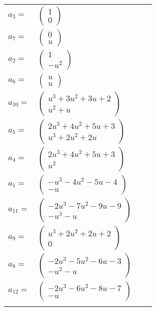 \documentclass[1p]{elsarticle_modified}
\theoremstyle{definition}
\begin{document}
\begin{tabular}{m{7pt} m{180pt} m{7pt} m{180pt} }
\flushright $a_{3}=$&$\begin{pmatrix}1\\0\end{pmatrix}$ \\
\flushright $a_{7}=$&$\begin{pmatrix}0\\u\end{pmatrix}$ \\
\flushright $a_{2}=$&$\begin{pmatrix}1\\- u^2\end{pmatrix}$ \\
\flushright $a_{6}=$&$\begin{pmatrix}u\\u\end{pmatrix}$ \\
\flushright $a_{10}=$&$\begin{pmatrix}u^3+3 u^2+3 u+2\\u^2+u\end{pmatrix}$ \\
\flushright $a_{5}=$&$\begin{pmatrix}2 u^3+4 u^2+5 u+3\\u^3+2 u^2+2 u\end{pmatrix}$ \\
\flushright $a_{4}=$&$\begin{pmatrix}2 u^3+4 u^2+5 u+3\\u^2\end{pmatrix}$ \\
\flushright $a_{1}=$&$\begin{pmatrix}- u^3-4 u^2-5 u-4\\- u\end{pmatrix}$ \\
\flushright $a_{11}=$&$\begin{pmatrix}-2 u^3-7 u^2-9 u-9\\- u^3- u\end{pmatrix}$ \\
\flushright $a_{9}=$&$\begin{pmatrix}u^3+2 u^2+2 u+2\\0\end{pmatrix}$ \\
\flushright $a_{8}=$&$\begin{pmatrix}-2 u^3-5 u^2-6 u-3\\- u^2- u\end{pmatrix}$ \\
\flushright $a_{12}=$&$\begin{pmatrix}-2 u^3-6 u^2-8 u-7\\- u\end{pmatrix}$\\&\end{tabular}
\end{document}
